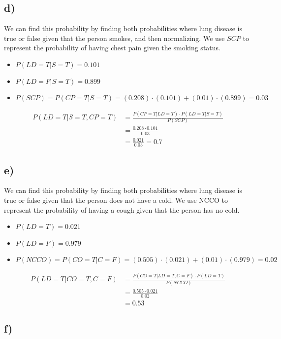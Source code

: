 \documentclass[12pt,a4paper]{article}
\begin{document}
\subsection*{d)}

We can find this probability by finding both probabilities where lung disease is true or false given that the person smokes, and then normalizing. We use $SCP$ to represent the probability of having chest pain given the smoking status.

\begin{itemize}
    \item $P(LD=T | S=T) = 0.101$
    \item $P(LD=F | S=T) = 0.899$
    \item $P(SCP) = P(CP=T | S=T) = (0.208) \cdot (0.101) + (0.01) \cdot (0.899) = 0.03$
\end{itemize}

\begin{align*}
P(LD=T | S=T, CP=T) &= \frac{P(CP=T | LD=T) \cdot P(LD=T | S=T)}{P(SCP)} \\
&= \frac{0.208 \cdot 0.101}{0.03} \\
&= \frac{0.021}{0.03} = {0.7}
\end{align*}

\subsection*{e)}

We can find this probability by finding both probabilities where lung disease is true or false given that the person does not have a cold. We use NCCO to represent the probability of having a cough given that the person has no cold.

\begin{itemize}
    \item $P(LD=T) = 0.021$
    \item $P(LD=F) = 0.979$
    \item $P(NCCO) = P(CO=T | C=F) = (0.505) \cdot (0.021) + (0.01) \cdot (0.979) = 0.02$
\end{itemize}

\begin{align*}
P(LD=T | CO=T, C=F) &= \frac{P(CO=T | LD=T, C=F) \cdot P(LD=T)}{P(NCCO)} \\
&= \frac{0.505 \cdot 0.021}{0.02} \\
& = {0.53}
\end{align*}

\subsection*{f)}
\end{document}
